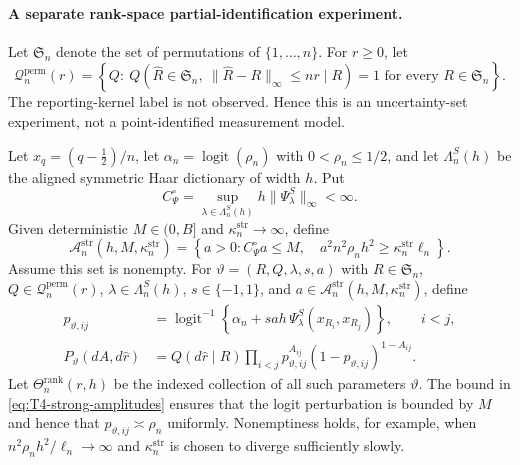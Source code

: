 \documentclass[11pt]{article}
\theoremstyle{definition}
\newcommand{\1}{\mathbf 1}\newcommand{\op}{\operatorname}
\begin{document}
\paragraph{A separate rank-space partial-identification experiment.}
Let $\mathfrak S_n$ denote the set of permutations of
$\{1,\ldots,n\}$.  For $r\ge0$, let
\begin{equation}
 \mathcal Q_n^{\mathrm{perm}}(r)
 =\left\{
 Q:\ Q\!\left(
   \widehat R\in\mathfrak S_n,\ 
   \|\widehat R-R\|_\infty\le nr
   \mid R
  \right)=1
 \text{ for every }R\in\mathfrak S_n
 \right\}.
 \label{eq:T4-reporting-kernels}
\end{equation}
The reporting-kernel label is not observed.  Hence this is an
uncertainty-set experiment, not a point-identified measurement model.

Let $x_q=(q-\tfrac12)/n$, let
$\alpha_n=\operatorname{logit}(\rho_n)$ with
$0<\rho_n\le1/2$, and let $\Lambda_n^S(h)$ be the aligned symmetric
Haar dictionary of width $h$.  Put
\[
 C_\Psi^\circ
 =\sup_{\lambda\in\Lambda_n^S(h)}
   h\|\Psi_\lambda^S\|_\infty<\infty.
\]
Given deterministic $M\in(0,B]$ and $\kappa_n^{\mathrm{str}}\to\infty$, define
\begin{equation}
 \mathcal A_n^{\mathrm{str}}(h,M,\kappa_n^{\mathrm{str}})
 =\left\{
 a>0:
 C_\Psi^\circ a\le M,\quad
 a^2n^2\rho_nh^2\ge\kappa_n^{\mathrm{str}}\ell_n
 \right\}.
 \label{eq:T4-strong-amplitudes}
\end{equation}
Assume this set is nonempty.  For
$\vartheta=(R,Q,\lambda,s,a)$ with
$R\in\mathfrak S_n$, $Q\in\mathcal Q_n^{\mathrm{perm}}(r)$,
$\lambda\in\Lambda_n^S(h)$, $s\in\{-1,1\}$, and
$a\in\mathcal A_n^{\mathrm{str}}(h,M,\kappa_n^{\mathrm{str}})$, define
\begin{align}
 p_{\vartheta,ij}
 &=\operatorname{logit}^{-1}\!\left\{
   \alpha_n+sah\,
   \Psi_\lambda^S(x_{R_i},x_{R_j})
  \right\},
 \qquad i<j,
 \label{eq:T4-lower-probabilities}\\
 P_\vartheta(dA,d\widehat r)
 &=Q(d\widehat r\mid R)
   \prod_{i<j}
   p_{\vartheta,ij}^{A_{ij}}
   (1-p_{\vartheta,ij})^{1-A_{ij}}.
 \label{eq:T4-lower-law}
\end{align}
Let $\Theta_n^{\mathrm{rank}}(r,h)$ be the indexed collection of all
such parameters $\vartheta$. The bound in \eqref{eq:T4-strong-amplitudes}
ensures that the logit perturbation is bounded by $M$ and hence that
$p_{\vartheta,ij}\asymp\rho_n$ uniformly.  Nonemptiness holds, for
example, when $n^2\rho_nh^2/\ell_n\to\infty$ and
$\kappa_n^{\mathrm{str}}$ is chosen
to diverge sufficiently slowly.
\end{document}
